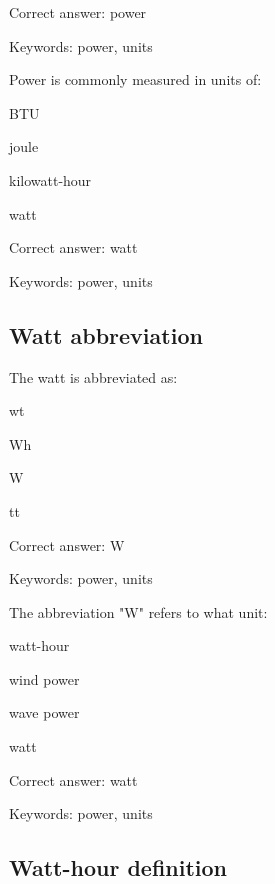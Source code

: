 Correct answer: power

Keywords: power, units

\begin{question}
	\item Power is commonly measured in units of:
\end{question}

\begin{answer}
	\item BTU
	\item joule
	\item kilowatt-hour
	\item watt
\end{answer}

Correct answer: watt

Keywords: power, units

\subsection{Watt abbreviation}

\begin{question}
	\item The watt is abbreviated as:
\end{question}

\begin{answer}
	\item wt
	\item Wh
	\item W
	\item tt
\end{answer}

Correct answer: W

Keywords: power, units

\begin{question}
	\item The abbreviation "W" refers to what unit:
\end{question}

\begin{answer}
	\item watt-hour
	\item wind power
	\item wave power
	\item watt
\end{answer}

Correct answer: watt

Keywords: power, units

\subsection{Watt-hour definition}

